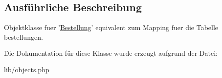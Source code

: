\subsection{\-Ausführliche \-Beschreibung}
\-Objektklasse fuer '\hyperlink{classBestellung}{\-Bestellung}' equivalent zum \-Mapping fuer die \-Tabelle bestellungen. 

\-Die \-Dokumentation für diese \-Klasse wurde erzeugt aufgrund der \-Datei\-:\begin{DoxyCompactItemize}
\item 
lib/objects.\-php\end{DoxyCompactItemize}
